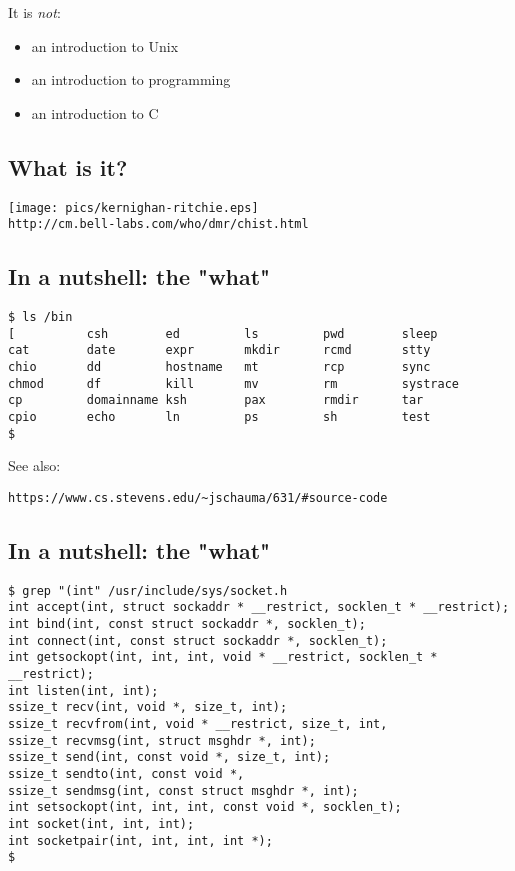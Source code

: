 \documentclass[sxga]{xdvislides}
\begin{document}
It is {\em not}:
\begin{itemize}
	\item an introduction to Unix
	\item an introduction to programming
	\item an introduction to C
\end{itemize}


\subsection{What is it?}
\begin{center}
\texttt{[image: pics/kernighan-ritchie.eps]} \\
\verb+http://cm.bell-labs.com/who/dmr/chist.html+
\end{center}

\subsection{In a nutshell: the "what"}
\begin{verbatim}
$ ls /bin
[          csh        ed         ls         pwd        sleep
cat        date       expr       mkdir      rcmd       stty
chio       dd         hostname   mt         rcp        sync
chmod      df         kill       mv         rm         systrace
cp         domainname ksh        pax        rmdir      tar
cpio       echo       ln         ps         sh         test
$
\end{verbatim}


See also:
\begin{verbatim}
https://www.cs.stevens.edu/~jschauma/631/#source-code
\end{verbatim}

\subsection{In a nutshell: the "what"}
\begin{verbatim}
$ grep "(int" /usr/include/sys/socket.h
int	accept(int, struct sockaddr * __restrict, socklen_t * __restrict);
int	bind(int, const struct sockaddr *, socklen_t);
int	connect(int, const struct sockaddr *, socklen_t);
int	getsockopt(int, int, int, void * __restrict, socklen_t * __restrict);
int	listen(int, int);
ssize_t	recv(int, void *, size_t, int);
ssize_t	recvfrom(int, void * __restrict, size_t, int,
ssize_t	recvmsg(int, struct msghdr *, int);
ssize_t	send(int, const void *, size_t, int);
ssize_t	sendto(int, const void *,
ssize_t	sendmsg(int, const struct msghdr *, int);
int	setsockopt(int, int, int, const void *, socklen_t);
int	socket(int, int, int);
int	socketpair(int, int, int, int *);
$
\end{verbatim}
\end{document}
